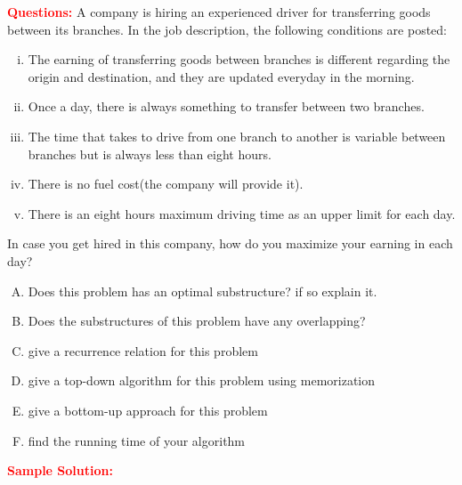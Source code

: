 \problem

\textcolor{Red}{\textbf{Questions:}}
A company is hiring an experienced driver for transferring goods between its branches. In the job description, the following conditions are posted:
\begin{enumerate}[i.]
	\item The earning of transferring goods between branches is different regarding the origin and destination, and they are updated everyday in the morning.
	\item Once a day, there is always something to transfer between two branches.
	\item The time that takes to drive from one branch to another is variable between branches but is always less than eight hours.
	\item There is no fuel cost(the company will provide it).
	\item There is an eight hours maximum driving time as an upper limit for each day.
\end{enumerate}

In case you get hired in this company, how do you maximize your earning in each day?

\begin{enumerate}[A.]
	\item Does this problem has an optimal substructure? if so explain it.
	\item Does the substructures of this problem have any overlapping?
	\item give a recurrence relation for this problem
	\item give a top-down algorithm for this problem using memorization
	\item give a bottom-up approach for this problem
	\item find the running time of your algorithm
\end{enumerate}

\textcolor{Red}{\textbf{Sample Solution:}}
